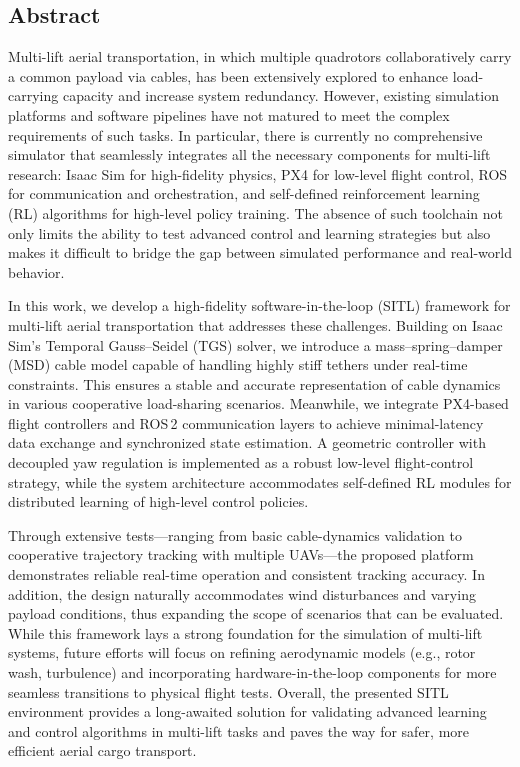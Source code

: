 \documentclass[12pt,twoside,letterpaper]{article}
\begin{document}


\begin{center}
    \section*{Abstract}
\end{center}
 Multi-lift aerial transportation, in which multiple quadrotors collaboratively carry a common payload via cables, has been extensively explored to enhance load-carrying capacity and increase system redundancy. However, existing simulation platforms and software pipelines have not matured to meet the complex requirements of such tasks. In particular, there is currently no comprehensive simulator that seamlessly integrates all the necessary components for multi-lift research: Isaac Sim for high-fidelity physics, PX4 for low-level flight control, ROS for communication and orchestration, and self-defined reinforcement learning (RL) algorithms for high-level policy training. The absence of such toolchain not only limits the ability to test advanced control and learning strategies but also makes it difficult to bridge the gap between simulated performance and real-world behavior.

In this work, we develop a high-fidelity software-in-the-loop (SITL) framework for multi-lift aerial transportation that addresses these challenges. Building on Isaac Sim’s Temporal Gauss–Seidel (TGS) solver, we introduce a mass–spring–damper (MSD) cable model capable of handling highly stiff tethers under real-time constraints. This ensures a stable and accurate representation of cable dynamics in various cooperative load-sharing scenarios. Meanwhile, we integrate PX4-based flight controllers and ROS\,2 communication layers to achieve minimal-latency data exchange and synchronized state estimation. A geometric controller with decoupled yaw regulation is implemented as a robust low-level flight-control strategy, while the system architecture accommodates self-defined RL modules for distributed learning of high-level control policies.

Through extensive tests—ranging from basic cable-dynamics validation to cooperative trajectory tracking with multiple UAVs—the proposed platform demonstrates reliable real-time operation and consistent tracking accuracy. In addition, the design naturally accommodates wind disturbances and varying payload conditions, thus expanding the scope of scenarios that can be evaluated. While this framework lays a strong foundation for the simulation of multi-lift systems, future efforts will focus on refining aerodynamic models (e.g., rotor wash, turbulence) and incorporating hardware-in-the-loop components for more seamless transitions to physical flight tests. Overall, the presented SITL environment provides a long-awaited solution for validating advanced learning and control algorithms in multi-lift tasks and paves the way for safer, more efficient aerial cargo transport.
\end{document}

